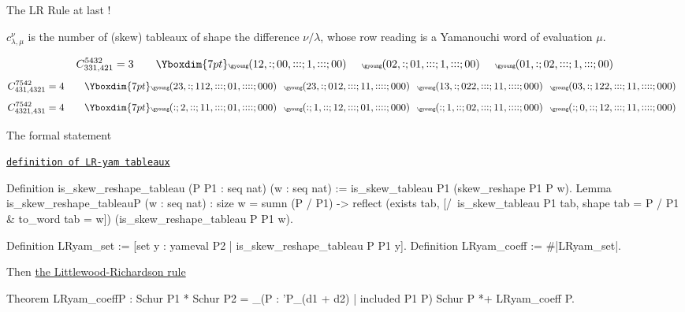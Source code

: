 \documentclass[compress,11pt]{beamer}
\begin{document}
\begin{frame}{The LR Rule at last !}

  \begin{THEO}
    $c_{\lambda, \mu}^{\nu}$ is the number of (skew) tableaux of shape the
    difference $\nu/\lambda$, whose row reading is a Yamanouchi word of
    evaluation $\mu$.
  \end{THEO}
  \[
  C_{331,421}^{5432} = 3
  \qquad \Yboxdim{7pt}\tiny
  \gyoung(12,:;00,:::;1,:::;00)\qquad
  \gyoung(02,:;01,:::;1,:::;00)\qquad
  \gyoung(01,:;02,:::;1,:::;00)
  \]
  \[
  C_{431,4321}^{7542} = 4
  \qquad \Yboxdim{7pt}\tiny
  \gyoung(23,:;112,:::;01,::::;000)\quad
  \gyoung(23,:;012,:::;11,::::;000)\quad
  \gyoung(13,:;022,:::;11,::::;000)\quad
  \gyoung(03,:;122,:::;11,::::;000)\quad
  \]
  \[
  C_{4321,431}^{7542} = 4
  \qquad \Yboxdim{7pt}\tiny
  \gyoung(:;2,::;11,:::;01,::::;000)\quad
  \gyoung(:;1,::;12,:::;01,::::;000)\quad
  \gyoung(:;1,::;02,:::;11,::::;000)\quad
  \gyoung(:;0,::;12,:::;11,::::;000)\quad
  \]

\end{frame}

\begin{frame}[fragile]{The formal statement}

  {\tiny\hfill
    \href{file:html/Combi.LRrule.therule.html#is_skew_reshape_tableau}%
    {\texttt{definition of LR-yam tableaux}}
  \vspace{-2mm}}
\begin{coqcode}
Definition is_skew_reshape_tableau (P P1 : seq nat) (w : seq nat) :=
  is_skew_tableau P1 (skew_reshape P1 P w).
Lemma is_skew_reshape_tableauP (w : seq nat) :
  size w = sumn (P / P1) ->
  reflect
    (exists tab, [/\ is_skew_tableau P1 tab,
                     shape tab = P / P1 & to_word tab = w])
    (is_skew_reshape_tableau P P1 w).

Definition LRyam_set :=
  [set y : yameval P2 | is_skew_reshape_tableau P P1 y].
Definition LRyam_coeff := #|LRyam_set|.
\end{coqcode}
Then
  {\tiny\hfill
    \href{file:html/Combi.LRrule.therule.html#LRyam_coeffP}%
    {the Littlewood-Richardson rule}
  \vspace{-2mm}}
\begin{coqcode}
Theorem LRyam_coeffP :
  Schur P1 * Schur P2 =
  \sum_(P : 'P_(d1 + d2) | included P1 P) Schur P *+ LRyam_coeff P.
\end{coqcode} 

\end{frame}
\end{document}
